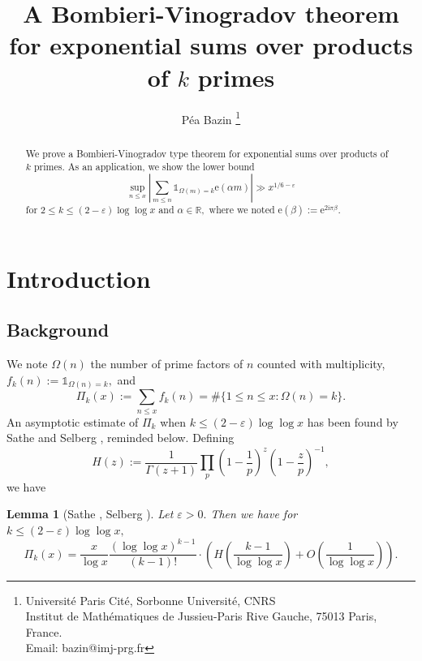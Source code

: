 \documentclass{article}
\title{A Bombieri-Vinogradov theorem for exponential sums over products of $k$ primes}
\author{P\'ea Bazin \orcidlink{0009-0000-7184-9130} \footnote{Universit\'e Paris Cit\'e, Sorbonne Universit\'e, CNRS \\ Institut de Math\'ematiques de Jussieu-Paris Rive Gauche, 75013 Paris, France. \\ Email: bazin@imj-prg.fr}}
\date{}
\newtheorem{lemma}[prop]{Lemma}
\newcommand{\e}{\mathrm{e}}
\newcommand{\ii}{\mathrm{i}}
\newcommand{\R}{\mathds{R}}
\newcommand{\Ind}{\mathbb{1}}
\newcommand{\eps}{\varepsilon}
\begin{document}
\maketitle

\begin{abstract}
    We prove a Bombieri-Vinogradov type theorem for exponential sums over products of $k$ primes. As an application, we show the lower bound $$\sup_{n\le x} \left|\sum_{m\le n} \Ind_{\Omega(m) = k} \e(\alpha m)\right| \gg x^{1/6 - \eps}$$ for $2\le k\le (2-\eps)\log\log x$ and $\alpha\in\R,$ where we noted $\e(\beta) := \e^{2\ii\pi\beta}.$ 
\end{abstract}

\section{Introduction}
\subsection{Background}

We note $\Omega(n)$ the number of prime factors of $n$ counted with multiplicity, $f_k(n) := \Ind_{\Omega(n) = k},$ and $$\Pi_k(x) := \sum_{n\le x} f_k(n) = \#\{1\le n\le x : \Omega(n) = k\}.$$ An asymptotic estimate of $\Pi_k$ when $k\le (2-\eps)\log\log x$ has been found by Sathe and Selberg \cite{sathe, selberg}, reminded below. Defining  
\begin{equation}\label{def-H}
    H(z) := \frac{1}{\Gamma(z+1)} \prod_p \left(1 - \frac{1}{p}\right)^z \left(1 - \frac{z}{p}\right)^{-1},
\end{equation}
we have
\begin{lemma}[Sathe \cite{sathe}, Selberg \cite{selberg}]\label{sathe-selberg}
    Let $\eps > 0.$ Then we have for $k \le (2-\eps)\log\log x,$ $$\Pi_k(x) = \frac{x}{\log x}\frac{(\log\log x)^{k-1}}{(k-1)!}\cdot \left( H\left(\frac{k-1}{\log\log x}\right) + O\left(\frac{1}{\log\log x}\right)\right).$$
\end{lemma}
\end{document}
